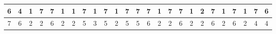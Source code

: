 \begin{sidewaystable}[]
\begin{tabular}{|c|c|c|c|c|c|c|c|c|c|c|c|c|c|c|c|c|c|c|c|c|c|c|c|c|}
    6       & 4                                               & 1                                               & 7                                               & 7                                               & 1                                               & 1                                               & 7                                               & 1                                               & 7                                               & 1                                                & 7                                                & 7                                                & 7                                               & 1                                               & 7                                               & 7                                               & 1                                               & 2                                               & 7                                               & 1                                                 & 7                                               & 1                                                & 7                                                & 6                                                \\ \hline
    7       & 6                                               & 2                                               & 2                                               & 6                                               & 2                                               & 2                                               & 5                                               & 3                                               & 5                                               & 2                                                & 5                                                & 5                                                & 6                                               & 2                                               & 2                                               & 6                                               & 2                                               & 2                                               & 6                                               & 2                                                 & 6                                               & 2                                                & 4                                                & 4                                                \\ \hline

\end{tabular}
\end{sidewaystable}
